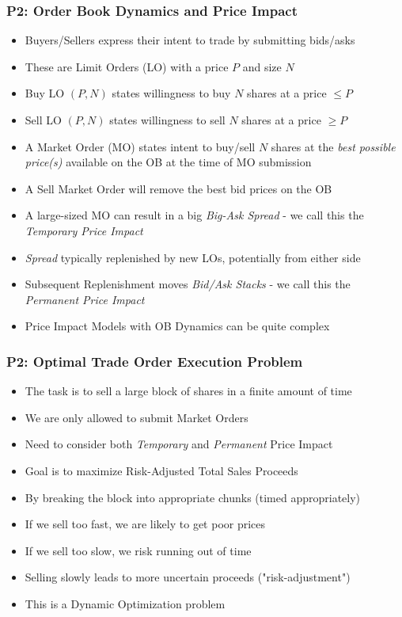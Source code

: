 \documentclass[handout]{beamer}
\begin{document}
\begin{frame}
\frametitle{P2: Order Book Dynamics and Price Impact}
\pause
\begin{itemize}[<+->]
\item Buyers/Sellers express their intent to trade by submitting bids/asks
\item These are Limit Orders (LO) with a price $P$ and size $N$
\item Buy LO $(P, N)$ states willingness to buy $N$ shares at a price $\leq P$
\item Sell  LO $(P, N)$ states willingness to sell $N$ shares at a price $\geq P$
\item A Market Order (MO) states intent to buy/sell $N$ shares at the {\em best possible price(s)} available on the OB at the time of MO submission
\item A Sell Market Order will remove the best bid prices on the OB
\item A large-sized MO can result in a big {\em Big-Ask Spread} - we call this the {\em Temporary Price Impact}
\item {\em Spread} typically replenished by new LOs, potentially from either side
\item Subsequent Replenishment moves {\em Bid/Ask Stacks} - we call this the {\em Permanent Price Impact}
\item Price Impact Models with OB Dynamics can be quite complex
\end{itemize}
\end{frame}

\begin{frame}
\frametitle{P2: Optimal Trade Order Execution Problem}
\pause
\begin{itemize}[<+->]
\item The task is to sell a large block of shares in a finite amount of time
\item We are only allowed to submit Market Orders
\item Need to consider both {\em Temporary} and {\em Permanent} Price Impact
\item Goal is to maximize Risk-Adjusted Total Sales Proceeds
\item By breaking the block into appropriate chunks (timed appropriately)
\item If we sell too fast, we are likely to get poor prices
\item If we sell too slow, we risk running out of time
\item Selling slowly leads to more uncertain proceeds ("risk-adjustment")
\item This is a Dynamic Optimization problem
\end{itemize}
\end{frame}
\end{document}
